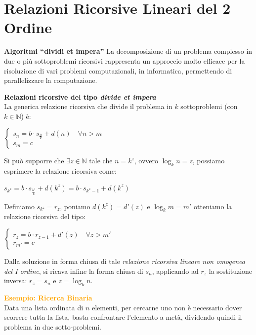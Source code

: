 \newpage
\section{Relazioni Ricorsive Lineari del 2 Ordine}
\begin{flushleft}
    \textbf{Algoritmi ``dividi et impera''}
    La decomposizione di un problema complesso in due o più sottoproblemi ricorsivi rappresenta un approccio molto efficace per la risoluzione di vari problemi computazionali, in informatica, permettendo di parallelizzare la computazione.

    \textbf{Relazioni ricorsive del tipo \textit{divide et impera}} \\
    La generica relazione ricorsiva che divide il problema in $k$ sottoproblemi (con $k \in \mathbb{N}$) è:

    {\centering
        $\begin{cases}
            s_n = b \cdot s_{\frac{n}{k}} + d(n) \quad \forall n > m \\
            s_m = c
        \end{cases}$
    \par}
    Si può supporre che $\exists z \in \mathbb{N}$ tale che $n = k^z$, ovvero $\log_k n = z$, possiamo esprimere la relazione ricorsiva come:

    {\centering
        $s_{k^z} = b \cdot s_{\frac{k^z}{k}} + d(k^z) = b \cdot s_{k^z-1} + d(k^z)$
    \par}

    Definiamo $s_{k^z} = r_z$, poniamo $d(k^z) = d'(z)$ e $\log_k m = m'$ otteniamo la relazione ricorsiva del tipo:

    {\centering
        $\begin{cases}
            r_z = b \cdot r_{z-1} + d'(z) \quad \forall z > m' \\
            r_{m'} = c
        \end{cases}$
    \par}
    Dalla soluzione in forma chiusa di tale \textit{relazione ricorsiva lineare non omogenea del I ordine}, si ricava infine la forma chiusa di $s_n$, applicando ad $r_z$ la sostituzione inversa: $r_z = s_n$ e $z = \log_k n$.
    \begin{boxA}
        \textcolor{orange}{\textbf{Esempio: Ricerca Binaria}} \\
        Data una lista ordinata di $n$ elementi, per cercarne uno non è necessario dover scorrere tutta la lista, basta confrontare l'elemento a metà, dividendo quindi il problema in due sotto-problemi. 


\end{boxA}
\end{flushleft}
